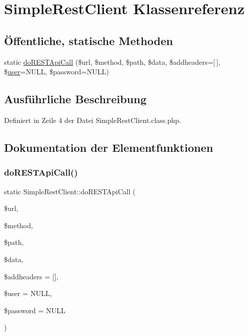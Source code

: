 \hypertarget{class_simple_rest_client}{}\section{Simple\+Rest\+Client Klassenreferenz}
\label{class_simple_rest_client}
\subsection*{Öffentliche, statische Methoden}
\begin{DoxyCompactItemize}
\item 
static \mbox{\hyperlink{class_simple_rest_client_afa5508191003cde6db6b4cef280972df}{do\+R\+E\+S\+T\+Api\+Call}} (\$url, \$method, \$path, \$data, \$addheaders=\mbox{[}$\,$\mbox{]}, \$\mbox{\hyperlink{classuser}{user}}=N\+U\+LL, \$password=N\+U\+LL)
\end{DoxyCompactItemize}


\subsection{Ausführliche Beschreibung}


Definiert in Zeile 4 der Datei Simple\+Rest\+Client.\+class.\+php.



\subsection{Dokumentation der Elementfunktionen}
\mbox{\label{class_simple_rest_client_afa5508191003cde6db6b4cef280972df}} 
\subsubsection{\texorpdfstring{do\+R\+E\+S\+T\+Api\+Call()}{doRESTApiCall()}}
{\footnotesize\ttfamily static Simple\+Rest\+Client\+::do\+R\+E\+S\+T\+Api\+Call (\begin{DoxyParamCaption}\item[{}]{\$url,  }\item[{}]{\$method,  }\item[{}]{\$path,  }\item[{}]{\$data,  }\item[{}]{\$addheaders = {\ttfamily \mbox{[}\mbox{]}},  }\item[{}]{\$user = {\ttfamily NULL},  }\item[{}]{\$password = {\ttfamily NULL} }\end{DoxyParamCaption})\hspace{0.3cm}{\ttfamily [static]}}


